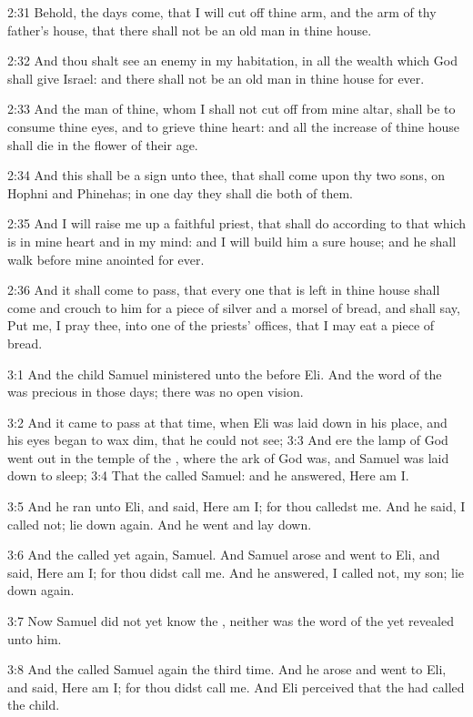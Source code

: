 2:31 Behold, the days come, that I will cut off thine arm, and the arm of thy father's house, that there shall not be an old man in thine house.

2:32 And thou shalt see an enemy in my habitation, in all the wealth which God shall give Israel: and there shall not be an old man in thine house for ever.

2:33 And the man of thine, whom I shall not cut off from mine altar, shall be to consume thine eyes, and to grieve thine heart: and all the increase of thine house shall die in the flower of their age.

2:34 And this shall be a sign unto thee, that shall come upon thy two sons, on Hophni and Phinehas; in one day they shall die both of them.

2:35 And I will raise me up a faithful priest, that shall do according to that which is in mine heart and in my mind: and I will build him a sure house; and he shall walk before mine anointed for ever.

2:36 And it shall come to pass, that every one that is left in thine house shall come and crouch to him for a piece of silver and a morsel of bread, and shall say, Put me, I pray thee, into one of the priests' offices, that I may eat a piece of bread.

3:1 And the child Samuel ministered unto the \LORD before Eli. And the word of the \LORD was precious in those days; there was no open vision.

3:2 And it came to pass at that time, when Eli was laid down in his place, and his eyes began to wax dim, that he could not see; 3:3 And ere the lamp of God went out in the temple of the \LORD, where the ark of God was, and Samuel was laid down to sleep; 3:4 That the \LORD called Samuel: and he answered, Here am I.

3:5 And he ran unto Eli, and said, Here am I; for thou calledst me.  And he said, I called not; lie down again. And he went and lay down.

3:6 And the \LORD called yet again, Samuel. And Samuel arose and went to Eli, and said, Here am I; for thou didst call me. And he answered, I called not, my son; lie down again.

3:7 Now Samuel did not yet know the \LORD, neither was the word of the \LORD yet revealed unto him.

3:8 And the \LORD called Samuel again the third time. And he arose and went to Eli, and said, Here am I; for thou didst call me. And Eli perceived that the \LORD had called the child.

